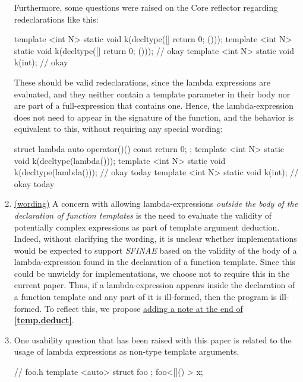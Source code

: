 \documentclass{wg21}
\begin{document}
\begin{enumerate}
    Furthermore, some questions were raised on the Core reflector regarding
    redeclarations like this:
\begin{cpp}
template <int N> static void k(decltype([]{ return 0; }()));
template <int N> static void k(decltype([]{ return 0; }())); // okay
template <int N> static void k(int);                         // okay
\end{cpp}

    These should be valid redeclarations, since the lambda expressions are
    evaluated, and they neither contain a template parameter in their body
    nor are part of a full-expression that contains one. Hence, the lambda-expression
    does not need to appear in the signature of the function, and the behavior
    is equivalent to this, without requiring any special wording:

\begin{cpp}
struct lambda { auto operator()() const { return 0; } };
template <int N> static void k(decltype(lambda{}()));
template <int N> static void k(decltype(lambda{}())); // okay today
template <int N> static void k(int);                  // okay today
\end{cpp}


  \item \label{discussion.sfinae}
    \hyperref[wording.sfinae]{(wording)}
    A concern with allowing lambda-expressions \textit{outside the body of
    the declaration of function templates} is the need to evaluate the validity
    of potentially complex expressions as part of template argument deduction.
    Indeed, without clarifying the wording, it is unclear whether implementations
    would be expected to support \textit{SFINAE} based on the validity of
    the body of a lambda-expression found in the declaration of a function
    template. Since this could be unwieldy for implementations, we choose not
    to require this in the current paper. Thus, if a lambda-expression appears
    inside the declaration of a function template and any part of it is ill-formed,
    then the program is ill-formed. To reflect this, we propose
    \hyperref[wording.sfinae]{adding a note at the end of \textbf{[temp.deduct]}}.


  \item \label{discussion.nontype}
    One usability question that has been raised with this paper is related
    to the usage of lambda expressions as non-type template arguments.

\begin{cpp}
// foo.h
template <auto> struct foo { };
foo<[]() {}> x;


\end{cpp}
\end{enumerate}
\end{document}
